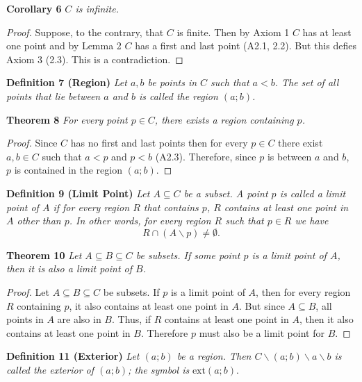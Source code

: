 \documentclass{article}
\begin{document}
\begin{flushleft}
\textbf{Corollary 6}
\textsl{$C$ is infinite.}
\begin{proof}
Suppose, to the contrary, that $C$ is finite. Then by Axiom 1 $C$ has at least one point and by Lemma 2 $C$ has a first and last point (A2.1, 2.2). But this defies Axiom 3 (2.3). This is a contradiction.
\end{proof}

\textbf{Definition 7 (Region)}
\textsl{Let $a,b$ be points in $C$ such that $a<b$. The set of all points that lie between $a$ and $b$ is called the region $(a;b)$.}\newline

\textbf{Theorem 8}
\textsl{For every point $p \in C$, there exists a region containing $p$.}
\begin{proof}
Since $C$ has no first and last points then for every $p \in C$ there exist $a,b \in C$ such that $a < p$ and $p < b$ (A2.3). Therefore, since $p$ is between $a$ and $b$, $p$ is contained in the region $(a;b)$.
\end{proof}

\textbf{Definition 9 (Limit Point)}
\textsl{Let $A \subseteq C$ be a subset. A point $p$ is called a limit point of $A$ if for every region $R$ that contains $p$, $R$ contains at least one point in $A$ other than $p$. In other words, for every region $R$ such that $p \in R$ we have
\[
R \cap (A \backslash p) \neq \emptyset.
\]}

\textbf{Theorem 10}
\textsl{Let $A \subseteq B \subseteq C$ be subsets. If some point $p$ is a limit point of $A$, then it is also a limit point of $B$.}
\begin{proof}
Let $A \subseteq B \subseteq C$ be subsets. If $p$ is a limit point of $A$, then for every region $R$ containing $p$, it also contains at least one point in $A$. But since $A \subseteq B$, all points in $A$ are also in $B$. Thus, if $R$ contains at least one point in $A$, then it also contains at least one point in $B$. Therefore $p$ must also be a limit point for $B$.
\end{proof}

\textbf{Definition 11 (Exterior)}
\textsl{Let $(a;b)$ be a region. Then $C \backslash (a;b) \backslash a \backslash b$ is called the exterior of $(a;b)$; the symbol is }$\text{ext}(a;b)$.\newline


\end{flushleft}
\end{document}
